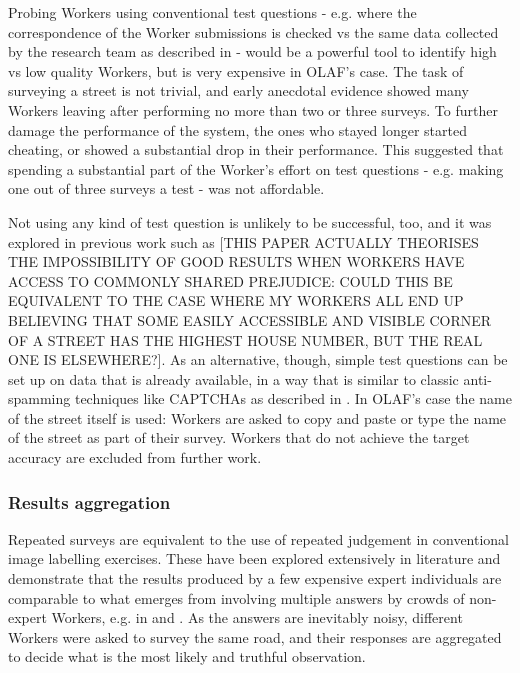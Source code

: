 Probing Workers using conventional test questions - e.g. where the correspondence of the Worker submissions is checked vs the same data collected by the research team as described in \cite{Kittur:2008gj} - would be a powerful tool to identify high vs low quality Workers, but is very expensive in OLAF's case. The task of surveying a street is not trivial, and early anecdotal evidence showed many Workers leaving after performing no more than two or three surveys. To further damage the performance of the system, the ones who stayed longer started cheating, or showed a substantial drop in their performance. This suggested that spending a substantial part of the Worker's effort on test questions - e.g. making one out of three surveys a test - was not affordable.

Not using any kind of test question is unlikely to be successful, too, and it was explored in previous work such as \cite{DellaPenna:tf} [THIS PAPER ACTUALLY THEORISES THE IMPOSSIBILITY OF GOOD RESULTS WHEN WORKERS HAVE ACCESS TO COMMONLY SHARED PREJUDICE: COULD THIS BE EQUIVALENT TO THE CASE WHERE MY WORKERS ALL END UP BELIEVING THAT SOME EASILY ACCESSIBLE AND VISIBLE CORNER OF A STREET HAS THE HIGHEST HOUSE NUMBER, BUT THE REAL ONE IS ELSEWHERE?]. As an alternative, though, simple test questions can be set up on data that is already available, in a way that is similar to classic anti-spamming techniques like CAPTCHAs as described in \cite{Difallah:2012ty}. In OLAF's case the name of the street itself is used: Workers are asked to copy and paste or type the name of the street as part of their survey. Workers that do not achieve the target accuracy are excluded from further work.

\subsubsection{Results aggregation}

Repeated surveys are equivalent to the use of repeated judgement in conventional image labelling exercises. These have been explored extensively in literature and demonstrate that the results produced by a few expensive expert individuals are comparable to what emerges from involving multiple answers by crowds of non-expert Workers, e.g. in \cite{Snow:2008wo} and \cite{Sheng:2008gra}. As the answers are inevitably noisy, different Workers were asked to survey the same road, and their responses are aggregated to decide what is the most likely and truthful observation. 
        
